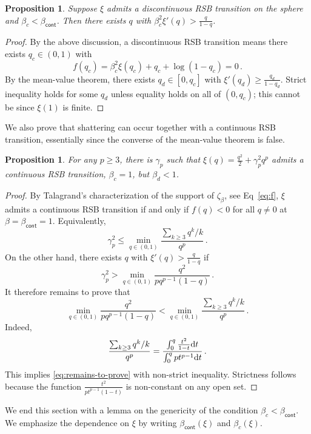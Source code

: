 \documentclass[11pt]{article}
\newtheorem{proposition}[theorem]{Proposition}
\theoremstyle{definition}
\numberwithin{equation}{section}
\newcommand{\<}{\langle}
\renewcommand{\>}{\rangle}
\def\de{{\rm d}}
\def\cont{{\mathsf{cont}}}
\begin{document}
\begin{proposition}
    Suppose $\xi$ admits a discontinuous RSB transition on the sphere and $\beta_c < \beta_\cont$.
    Then there exists $q$ with $\beta_c^2 \xi'(q)>\frac{q}{1-q}$.
\end{proposition}

\begin{proof}
    By the above discussion, a discontinuous RSB transition means there exists $q_c\in (0,1)$ with
    \[
    f(q_c) = \beta_c^2 \xi(q_c)+q_c+\log(1-q_c)=0\,.
    \]
    By the mean-value theorem, there exists $q_d\in [0,q_c]$ with $\xi'(q_d)\geq \frac{q_d}{1-q_d}$.
    Strict inequality holds for some $q_d$ unless equality holds on all of $(0,q_c)$; this cannot be since $\xi(1)$ is finite.
\end{proof}


We also prove that shattering can occur together with a continuous RSB transition, essentially since the converse of the mean-value theorem is false.




\begin{proposition}
For any $p\geq 3$, there is $\gamma_p$ such that $\xi(q)=\frac{q^2}{2}+\gamma_p^2 q^p$ admits a continuous RSB transition, $\beta_c=1$, but $\beta_d<1$.
\end{proposition}

\begin{proof}
By Talagrand's characterization of the support of $\zeta_\beta$, see Eq~\eqref{eq:f}, $\xi$ admits a continuous RSB transition if and only if $f(q)<0$ for all $q \neq 0$ at $\beta = \beta_{\cont} = 1$. Equivalently, 
\[
\gamma_p^2 
\leq 
\min_{q\in (0,1)}
\frac{\sum_{k\geq 3} q^k /k}{q^p}\, .
\]
On the other hand, there exists $q$ with $\xi'(q)>\frac{q}{1-q}$ if 
\[
\gamma_p^2 
>
\min_{q\in (0,1)}
\frac{q^2}{pq^{p-1}(1-q)}\,.
\]
It therefore remains to prove that
\begin{equation}
\label{eq:remains-to-prove}
\min_{q\in (0,1)}
\frac{q^2}{pq^{p-1}(1-q)}
<
\min_{q\in (0,1)}
\frac{\sum_{k\geq 3} q^k /k}{q^p}\,.
\end{equation}
Indeed,
\[
\frac{\sum_{k\geq 3} q^k /k}{q^p}
=
\frac{\int_0^q \frac{t^2}{1-t}\de t}{\int_0^q pt^{p-1}\de t}
\,.
\]
This implies \eqref{eq:remains-to-prove} with non-strict inequality.
Strictness follows because the function $\frac{t^2}{pt^{p-1}(1-t)}$ is non-constant on any open set. 
\end{proof}


We end this section with a lemma on the genericity of the condition $\beta_c < \beta_{\cont}$. We emphasize the dependence on $\xi$ by writing $\beta_{\cont}(\xi)$ and $\beta_c(\xi)$.
\end{document}
